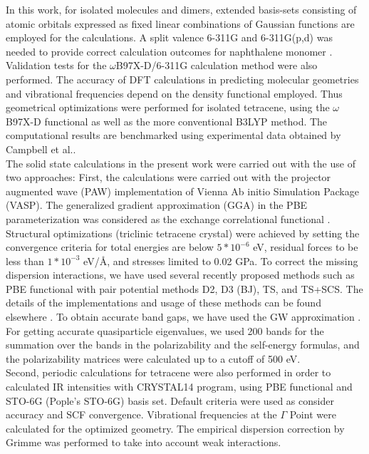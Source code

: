  In this work, for isolated molecules and dimers, extended basis-sets consisting of atomic orbitals expressed as fixed linear combinations of Gaussian functions are employed for the calculations.  A split valence 6-311G and 6-311G(p,d) \cite{krishnan1980self,frisch1984self} was needed to provide correct calculation outcomes for naphthalene monomer \cite{saeki2006theoretical}. Validation tests for the $\omega$B97X-D/6-311G calculation method were also performed. The accuracy of DFT calculations in predicting molecular geometries and vibrational frequencies depend on the density functional employed. Thus geometrical optimizations were performed for isolated tetracene, using the $\omega$B97X-D functional as well as the more conventional B3LYP method. The computational results are benchmarked using experimental data obtained by Campbell et al.\cite{campbell1962crystal}.\\
 
 The solid state calculations in the present work were carried out with the use of two approaches:
First, the calculations were carried out with the projector augmented wave (PAW) implementation of Vienna Ab initio Simulation Package (VASP)\cite{kresse1996efficient}. The generalized gradient approximation (GGA) in the PBE parameterization was considered as the exchange correlational functional \cite{perdew1996generalized}. Structural optimizations (triclinic tetracene crystal) were achieved by setting the convergence criteria for total energies are below $5*10^{-6}$ eV, residual forces to be less than $1*10^{-3}$ eV/Å, and stresses limited to 0.02 GPa. To correct the missing dispersion interactions, we have used several recently proposed methods such as PBE functional with pair potential methods D2, D3 (BJ), TS, and TS+SCS. The details of the implementations and usage of these methods can be found elsewhere \cite{grimme2006semiempirical,grimme2011effect,tkatchenko2009accurate,tkatchenko2012accurate,dion2004van}. To obtain accurate band gaps, we have used the GW approximation \cite{bowman2008variational}.  For getting accurate quasiparticle eigenvalues, we used 200 bands for the summation over the bands in the polarizability and the self-energy formulas, and the polarizability matrices were calculated up to a cutoff  of 500 eV.\\ 
Second, periodic calculations for tetracene were also performed in order to calculated IR intensities with CRYSTAL14 program\cite{dovesi2014crystal14}, using PBE functional and STO-6G (Pople's STO-6G) basis set. Default criteria were used as consider accuracy and SCF convergence. Vibrational frequencies at the $\Gamma$ Point were calculated for the optimized geometry. The empirical dispersion correction by Grimme \cite{grimme2006semiempirical} was performed to take into account weak interactions. 


